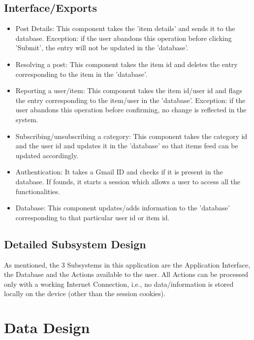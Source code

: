 \documentclass[a4paper,12pt]{article}
\begin{document}
\subsection{Interface/Exports}
\begin{itemize}
\item Post Details: This component takes the 'item details' and sends it to the database. Exception: if the user abandons this operation before clicking 'Submit', the entry will not be updated in the 'database'. 
\item Resolving a post: This component takes the item id and deletes the entry corresponding to the item in the 'database'.  
\item Reporting a user/item: This component takes the item id/user id and flags the entry corresponding to the item/user in the 'database'. Exception: if the user abandons this operation before confirming, no change is reflected in the system. 
\item Subscribing/unsubscribing a category: This component takes the category id and the user id and updates it in the 'database' so that items feed can be updated accordingly. 
\item Authentication: It takes a Gmail ID and checks if it is present in the database. If founds, it starts a session which allows a user to access all the functionalities. 
\item Database: This component updates/adds information to the 'database' corresponding to that particular user id or item id.
\end{itemize}
\subsection{Detailed Subsystem Design}
As mentioned, the 3 Subsystems in this application are the Application Interface, the Database and the Actions available to the user. All Actions can be processed only with a working Internet Connection, i.e., no data/information is stored locally on the device (other than the session cookies).
\section{Data Design}
\end{document}
